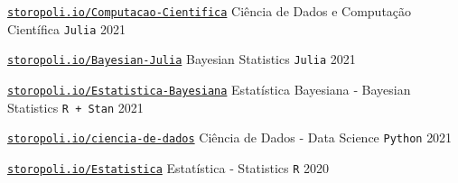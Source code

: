 

\begin{cventries}

  \cventry
    {\href{https://storopoli.io/Computacao-Cientifica/}{\texttt{storopoli.io/Computacao-Cientifica}}} %
    {Ciência de Dados e Computação Científica} %
    {\texttt{Julia}} %
    {2021} %

  \cventry
    {\href{https://storopoli.io/Bayesian-Julia/}{\texttt{storopoli.io/Bayesian-Julia}}} %
    {Bayesian Statistics} %
    {\texttt{Julia}} %
    {2021} %

  \cventry
    {\href{https://storopoli.io/Estatistica-Bayesiana/}{\texttt{storopoli.io/Estatistica‑Bayesiana}}} %
    {Estatística Bayesiana ‑ Bayesian Statistics} %
    {\texttt{R + Stan}} %
    {2021} %

  \cventry
    {\href{https://storopoli.io/ciencia-de-dados}{\texttt{storopoli.io/ciencia-de-dados}}} %
    {Ciência de Dados ‑ Data Science} %
    {\texttt{Python}} %
    {2021} %

  \cventry
    {\href{https://storopoli.io/Estatistica/}{\texttt{storopoli.io/Estatistica}}} %
    {Estatística ‑ Statistics} %
    {\texttt{R}} %
    {2020} %

\end{cventries}
